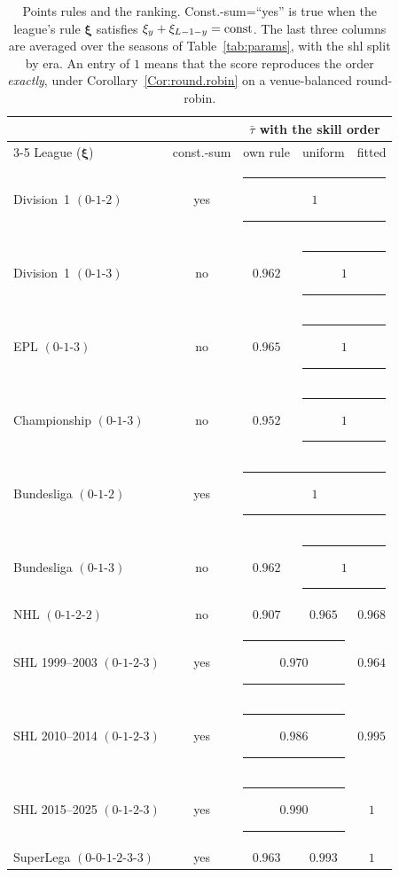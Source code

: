 \documentclass[letterpaper,12pt]{article}
\newcommand{\tnr}[1]{{\textnormal{#1}}}
\newcommand{\bxi}{\boldsymbol{\xi}}
\begin{document}
\begin{table}[t]
\centering
\caption{Points rules and the ranking. Const.-sum=``yes'' is true when the league's rule
$\bxi$ satisfies $\xi_y+\xi_{L-1-y}=\tnr{const}$. The last three columns are averaged
over the seasons of Table~\ref{tab:params}, with the \gls{shl} split by era. An entry of $1$ means that the score reproduces the order
\emph{exactly}, under Corollary~\ref{Cor:round.robin} on a venue-balanced
round-robin.}
\label{tab:points}
{\footnotesize\setlength{\tabcolsep}{4pt}
\begin{tabular}{lcccc}
\hline
 & & \multicolumn{3}{c}{$\bar\tau$ with the skill order}\\
\cline{3-5}
League ($\bxi$) & const.-sum & own rule & uniform & fitted\\
\hline
Division~1 $(0\text{-}1\text{-}2)$& yes & \multicolumn{3}{c}{\rule[.45ex]{5.2em}{.4pt}\;$1$\;\rule[.45ex]{5.2em}{.4pt}}\\
Division~1 $(0\text{-}1\text{-}3)$& no  & $0.962$ & \multicolumn{2}{c}{\rule[.45ex]{2.8em}{.4pt}\;$1$\;\rule[.45ex]{2.8em}{.4pt}}\\
EPL $(0\text{-}1\text{-}3)$ & no  & $0.965$ & \multicolumn{2}{c}{\rule[.45ex]{2.8em}{.4pt}\;$1$\;\rule[.45ex]{2.8em}{.4pt}}\\
Championship $(0\text{-}1\text{-}3)$ & no  & $0.952$ & \multicolumn{2}{c}{\rule[.45ex]{2.8em}{.4pt}\;$1$\;\rule[.45ex]{2.8em}{.4pt}}\\
Bundesliga $(0\text{-}1\text{-}2)$& yes & \multicolumn{3}{c}{\rule[.45ex]{5.2em}{.4pt}\;$1$\;\rule[.45ex]{5.2em}{.4pt}}\\
Bundesliga $(0\text{-}1\text{-}3)$& no  & $0.962$ & \multicolumn{2}{c}{\rule[.45ex]{2.8em}{.4pt}\;$1$\;\rule[.45ex]{2.8em}{.4pt}}\\
NHL $(0\text{-}1\text{-}2\text{-}2)$ & no  & $0.907$ & $0.965$ & $0.968$\\
SHL 1999--2003 $(0\text{-}1\text{-}2\text{-}3)$ & yes & \multicolumn{2}{c}{\rule[.45ex]{2.6em}{.4pt}\;$0.970$\;\rule[.45ex]{2.6em}{.4pt}} & $0.964$\\
SHL 2010--2014 $(0\text{-}1\text{-}2\text{-}3)$ & yes & \multicolumn{2}{c}{\rule[.45ex]{2.6em}{.4pt}\;$0.986$\;\rule[.45ex]{2.6em}{.4pt}} & $0.995$\\
SHL 2015--2025 $(0\text{-}1\text{-}2\text{-}3)$ & yes & \multicolumn{2}{c}{\rule[.45ex]{2.6em}{.4pt}\;$0.990$\;\rule[.45ex]{2.6em}{.4pt}} & $1$\\
SuperLega $(0\text{-}0\text{-}1\text{-}2\text{-}3\text{-}3)$ & yes & $0.963$ & $0.993$ & $1$\\
\hline
\end{tabular}}
\end{table}
\end{document}
